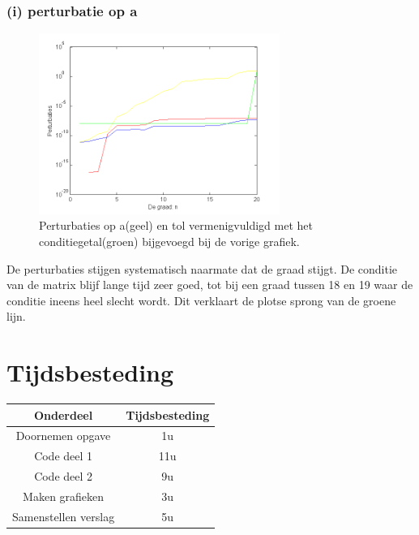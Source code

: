 \documentclass[11pt,a4paper]{article}
\begin{document}
\subsubsection*{(i) perturbatie op a}
\vspace{-20pt}
\begin{figure}[H]
	\centering
	\includegraphics[width=0.7\textwidth]{22i1.png}
	\vspace{-10pt}
	\caption*{Perturbaties op a(geel) en tol vermenigvuldigd met het conditiegetal(groen) bijgevoegd bij de vorige grafiek.}
	\end{figure}
\vspace{-10pt}
De perturbaties stijgen systematisch naarmate dat de graad stijgt. De conditie van de matrix blijf lange tijd zeer goed, tot bij een graad tussen 18 en 19 waar de conditie ineens heel slecht wordt. Dit verklaart de plotse sprong van de groene lijn.
\vspace{-5pt}
\section{Tijdsbesteding}
\begin{center}
\begin{tabular}{ c || c }
Onderdeel & Tijdsbesteding\\
\hline
\hline
Doornemen opgave & 1u\\
\hline
Code deel 1 & 11u\\
\hline
Code deel 2 & 9u\\
\hline
Maken grafieken & 3u\\
\hline
Samenstellen verslag & 5u
\end{tabular}
\end{center}
\end{document}
